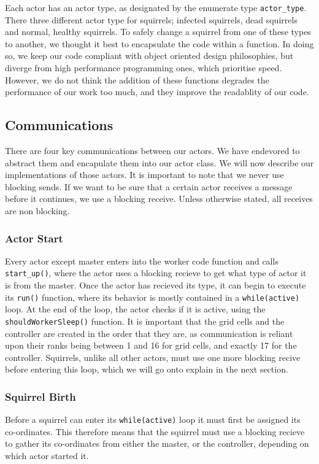 \documentclass[oneside]{article}
\begin{document}
 Each actor has an actor type, as designated by the enumerate type \texttt{actor\_type}. There three different actor type for squirrels; infected squirrels, dead squirrels and normal, healthy squirrels. To safely change a squirrel from one of these types to another, we thought it best to encapsulate the code within a function. In doing so, we keep our code compliant with object oriented design philosophies, but diverge from high performance programming ones, which prioritise speed. However, we do not think the addition of these functions degrades the performance of our work too much, and they improve the readablity of our code.

 \subsection{Communications}

 There are four key communications between our actors. We have endevored to abstract them and encapulate them into our actor class. We will now describe our implementations of those actors. It is important to note that we never use blocking sends. If we want to be sure that a certain actor receives a message before it continues, we use a blocking receive. Unless otherwise stated, all receives are non blocking.

 \subsubsection{Actor Start}
 Every actor except master enters into the worker code function and calls \texttt{start\_up()}, where the actor uses a blocking recieve to get what type of actor it is from the master. Once the actor has recieved its type, it can begin to execute its \texttt{run()} function, where its behavior is mostly contained in a \texttt{while(active)} loop. At the end of the loop, the actor checks if it is active, using the \texttt{shouldWorkerSleep()} function. It is important that the grid cells and the controller are created in the order that they are, as communication is reliant upon their ranks being between 1 and 16 for grid cells, and exactly 17 for the controller. Squirrels, unlike all other actors, must use one more blocking recive before entering this loop, which we will go onto explain in the next section.
\subsubsection{Squirrel Birth}
Before a squirrel can enter its \texttt{while(active)} loop it must first be assigned its co-ordinates. This therefore means that the squirrel must use a blocking recieve to gather its co-ordinates from either the master, or the controller, depending on which actor started it.
\end{document}
